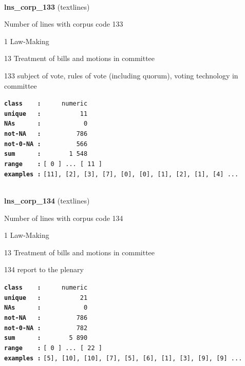\documentclass[]{article}
\begin{document}
~

\textbf{lns\_corp\_133} (textlines)

Number of lines with corpus code 133

1 Law-Making

13 Treatment of bills and motions in committee

133 subject of vote, rules of vote (including quorum), voting technology
in committee

\textbf{\texttt{class\ \ \ \ :}} \texttt{~~~~~numeric}\\
\textbf{\texttt{unique\ \ \ :}} \texttt{~~~~~~~~~~11}\\
\textbf{\texttt{NAs\ \ \ \ \ \ :}} \texttt{~~~~~~~~~~~0}\\
\textbf{\texttt{not-NA\ \ \ :}} \texttt{~~~~~~~~~786}\\
\textbf{\texttt{not-0-NA\ :}} \texttt{~~~~~~~~~566}\\
\textbf{\texttt{sum\ \ \ \ \ \ :}} \texttt{~~~~~~~1~548}\\
\textbf{\texttt{range\ \ \ \ :}}
\texttt{{[}\ 0\ {]}\ ...\ {[}\ 11\ {]}}\\
\textbf{\texttt{examples\ :}}
\texttt{{[}11{]},\ {[}2{]},\ {[}3{]},\ {[}7{]},\ {[}0{]},\ {[}0{]},\ {[}1{]},\ {[}2{]},\ {[}1{]},\ {[}4{]}\ ...}\\

~

\textbf{lns\_corp\_134} (textlines)

Number of lines with corpus code 134

1 Law-Making

13 Treatment of bills and motions in committee

134 report to the plenary

\textbf{\texttt{class\ \ \ \ :}} \texttt{~~~~~numeric}\\
\textbf{\texttt{unique\ \ \ :}} \texttt{~~~~~~~~~~21}\\
\textbf{\texttt{NAs\ \ \ \ \ \ :}} \texttt{~~~~~~~~~~~0}\\
\textbf{\texttt{not-NA\ \ \ :}} \texttt{~~~~~~~~~786}\\
\textbf{\texttt{not-0-NA\ :}} \texttt{~~~~~~~~~782}\\
\textbf{\texttt{sum\ \ \ \ \ \ :}} \texttt{~~~~~~~5~890}\\
\textbf{\texttt{range\ \ \ \ :}}
\texttt{{[}\ 0\ {]}\ ...\ {[}\ 22\ {]}}\\
\textbf{\texttt{examples\ :}}
\texttt{{[}5{]},\ {[}10{]},\ {[}10{]},\ {[}7{]},\ {[}5{]},\ {[}6{]},\ {[}1{]},\ {[}3{]},\ {[}9{]},\ {[}9{]}\ ...}\\
\end{document}
